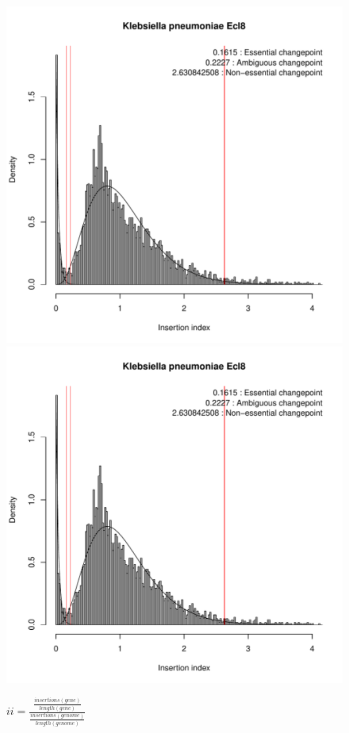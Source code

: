 \documentclass[a4paper,10pt]{article}
\begin{document}
\begin{figure}
\includegraphics[scale=0.2, page=11]{lars.pdf}
\includegraphics[scale=0.2, page=12]{lars.pdf}
\caption{$ii=\frac{\frac{insertions(gene)}{length(gene)}}{\frac{insertions(genome)}{length(genome)}}$\newline
}
\end{figure}
\end{document}
